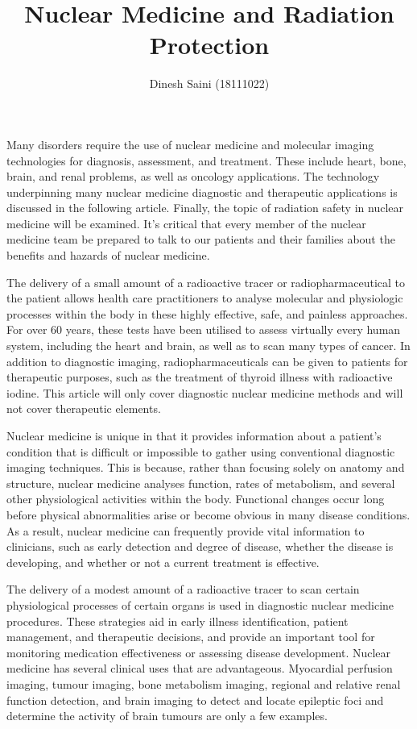 \documentclass[12pt]{article}
\begin{document}
\title{Nuclear Medicine and Radiation Protection}
\author{Dinesh Saini (18111022)}
\maketitle



Many disorders require the use of nuclear medicine and molecular imaging technologies for diagnosis, assessment, and treatment. These include heart, bone, brain, and renal problems, as well as oncology applications. The technology underpinning many nuclear medicine diagnostic and therapeutic applications is discussed in the following article. Finally, the topic of radiation safety in nuclear medicine will be examined. It's critical that every member of the nuclear medicine team be prepared to talk to our patients and their families about the benefits and hazards of nuclear medicine.
\par
The delivery of a small amount of a radioactive tracer or radiopharmaceutical to the patient allows health care practitioners to analyse molecular and physiologic processes within the body in these highly effective, safe, and painless approaches. For over 60 years, these tests have been utilised to assess virtually every human system, including the heart and brain, as well as to scan many types of cancer. In addition to diagnostic imaging, radiopharmaceuticals can be given to patients for therapeutic purposes, such as the treatment of thyroid illness with radioactive iodine. This article will only cover diagnostic nuclear medicine methods and will not cover therapeutic elements.
\par
Nuclear medicine is unique in that it provides information about a patient's condition that is difficult or impossible to gather using conventional diagnostic imaging techniques. This is because, rather than focusing solely on anatomy and structure, nuclear medicine analyses function, rates of metabolism, and several other physiological activities within the body. Functional changes occur long before physical abnormalities arise or become obvious in many disease conditions. As a result, nuclear medicine can frequently provide vital information to clinicians, such as early detection and degree of disease, whether the disease is developing, and whether or not a current treatment is effective.
\par
The delivery of a modest amount of a radioactive tracer to scan certain physiological processes of certain organs is used in diagnostic nuclear medicine procedures. These strategies aid in early illness identification, patient management, and therapeutic decisions, and provide an important tool for monitoring medication effectiveness or assessing disease development. Nuclear medicine has several clinical uses that are advantageous. Myocardial perfusion imaging, tumour imaging, bone metabolism imaging, regional and relative renal function detection, and brain imaging to detect and locate epileptic foci and determine the activity of brain tumours are only a few examples.
\end{document}
